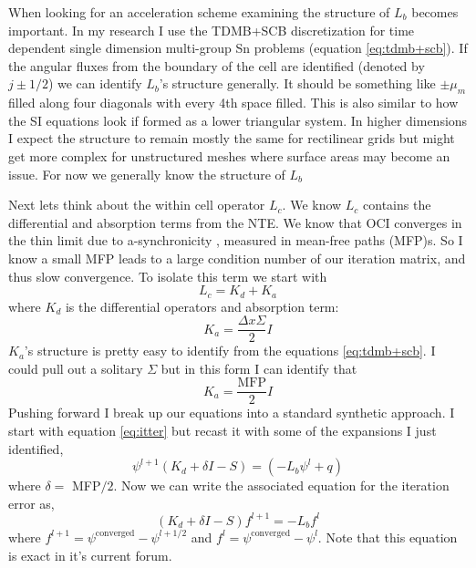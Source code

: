 When looking for an acceleration scheme examining the structure of $L_b$ becomes important.
In my research I use the TDMB+SCB discretization for time dependent single dimension multi-group Sn problems (equation \ref{eq:tdmb+scb}).
If the angular fluxes from the boundary of the cell are identified (denoted by $j\pm1/2$) we can identify $L_b$'s structure generally.
It should be something like $\pm\mu_m$ filled along four diagonals with every 4th space filled.
This is also similar to how the SI equations look if formed as a lower triangular system.
In higher dimensions I expect the structure to remain mostly the same for rectilinear grids but might get more complex for unstructured meshes where surface areas may become an issue.
For now we generally know the structure of $L_b$

Next lets think about the within cell operator $L_c$.
We know $L_c$ contains the differential and absorption terms from the NTE.
We know that OCI converges in the thin limit due to a-synchronicity \cite{rosa_cellwise_2013, hoagland_hybrid_2021}, measured in mean-free paths (MFP)s.
So I know a small MFP leads to a large condition number of our iteration matrix, and thus slow convergence.
To isolate this term we start with
\begin{equation}
    L_c = K_d + K_a
\end{equation}
where $K_d$ is the differential operators and absorption term:
\begin{equation}
    K_a = \frac{\Delta x \Sigma}{2}  I
\end{equation}
$K_a$'s structure is pretty easy to identify from the equations \ref{eq:tdmb+scb}.
I could pull out a solitary $\Sigma$ but in this form I can identify that
\begin{equation}
    K_a = \frac{\text{MFP}}{2}  I
\end{equation}
Pushing forward I break up our equations into a standard synthetic approach.
I start with equation \ref{eq:itter} but recast it with some of the expansions I just identified,
\begin{equation}
    \psi^{l+1}(K_d + \delta I - S) = (-L_b\psi^l + q)
\end{equation}
where $\delta=$ MFP$/2$. Now we can write the associated equation for the iteration error as,
\begin{equation}
    (K_d + \delta I-S) f^{l+1} = -L_b f^l
\end{equation}
where $f^{l+1} = \psi^{\text{converged}}-\psi^{l+1/2}$ and $f^{l} = \psi^{\text{converged}}-\psi^{l}$.
Note that this equation is exact in it's current forum.
